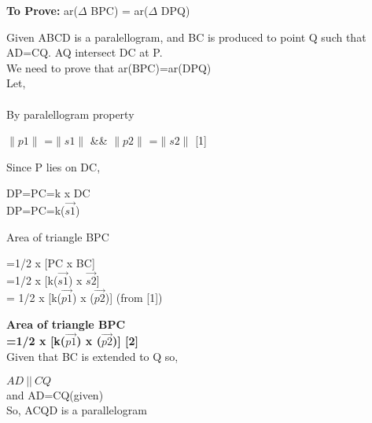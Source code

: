 \documentclass[journal,12pt,twocolumn]{IEEEtran}
\begin{document}
\justify
\textbf{To Prove:}
ar($\Delta$ BPC) = ar($\Delta$ DPQ)
\begin{flushleft}
Given ABCD is a paralellogram, and BC is produced to point Q such that AD=CQ. AQ intersect DC at P.\\
We need to prove that ar(BPC)=ar(DPQ)\\
Let,\hfill \\
\\
\justify
\vspace{0.1cm}
By paralellogram property\\
\begin{enumerate}
$\lVert{p1}\rVert$ =$\lVert{s1}\rVert$ \&\& $\lVert{p2}\rVert$ =$\lVert{s2}\rVert$ \hspace{1.2cm}[1]\\
\end{enumerate}
\vspace{3cm}
Since P lies on DC,\\
\begin{enumerate}
DP=PC=k x DC\\
DP=PC=k($\vec{s1}$)\\
\end{enumerate}
Area of triangle BPC \\
\begin{enumerate}
=1/2 x [PC x BC] \\
=1/2 x [k($\vec{s1}$) x $\vec{s2}$] \\
= 1/2 x [k($\vec{p1}$) x ($\vec{p2}$)] (from [1])\\ 
\end{enumerate}
\textbf{Area of triangle BPC}\\
\vspace{0.1cm}
\textbf{=1/2 x [k($\vec{p1}$) x ($\vec{p2}$)]  \hspace{2.5cm}[2]}\\
\vspace{0.1cm}
Given that BC is extended to Q so,\\ 
\begin{enumerate}
$ AD \: || \: CQ $\\ and AD=CQ(given)\\ So, ACQD is a parallelogram \\
\end{enumerate}
\vspace{0.1cm}

\end{flushleft}
\end{document}
